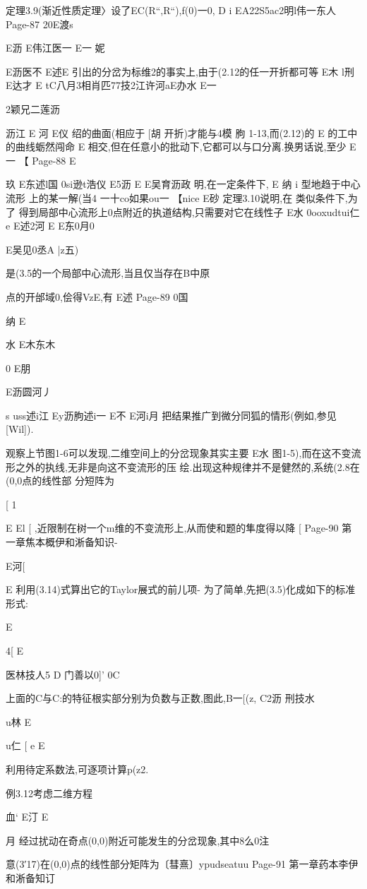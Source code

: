 {{{定理3.9(渐近性质定理〉设了EC(R“,R“),f(0)一0,
D
i
EA22S5ac2明l伟一东人
Page-87
20E渡s

E沥
E伟江医一
E一
妮

E沥医不
E述E
引出的分岔为标维2的事实上,由于(2.12的任一开折都可等
E木
l刑
E达才
E
tC八月3相肖匹77技2江许河aE办水
E一

2颖兄二莲沥

沥江
E
河
E仪
绍的曲面(相应于
[胡
开折)才能与4模
朐
1-13,而(2.12)的
E
的工中的曲线蛎然闯命
E
相交,但在任意小的批动下,它都可以与口分离.换男话说,至少
E一
【
Page-88
E

玖
E东述l国
0si逊t浩仪
E5沥
E
E吴育沥政
明,在一定条件下,
E
纳
i
型地趋于中心流形
上的某一解(当4
一十co如果ou一
【nice
E砂
定理3.10说明,在
类似条件下,为了
得到局部中心流形上0点附近的执道结构,只需要对它在线性子
E水
0ooxudtui仁e
E述2河
E
E东0月0

E吴见0丞A
|z五)}是(3.5的一个局部中心流形,当且仅当存在B中原

点的开邰域0,侩得VzE,有
E述
Page-89
0国

纳
E

水
E木东木

0
E朋

E沥圆河丿

s
uss述i江
Ey沥朐述i一
E不
E河i月
把结果推广到微分同狐的情形(例如,参见[Wil]).

观察上节图1-6可以发现,二维空间上的分岔现象其实主要
E水
图1-5),而在这不变流形之外的执线,无非是向这不变流形的压
绘.出现这种规律并不是健然的,系统(2.8在(0,0点的线性部
分短阵为

[
1

E
El
[
,近限制在树一个m维的不变流形上,从而使和题的隼度得以降
[
Page-90
第一章焦本概伊和淅备知识-

E河[

E
利用(3.14)式算出它的Taylor展式的前儿项-
为了简单,先把(3.5)化成如下的标准形式:

E

4[
E

医林技人5
D
门善以0]'
0C

上面的C与C:的特征根实部分别为负数与正数,图此,B一[(z,
C2沥
刑技水

u林
E

u仁
[
e
E

利用待定系数法,可逐项计算p(z2.

例3.12考虑二维方程

血`
E汀
E

月
经过扰动在奇点(0,0)附近可能发生的分岔现象,其中8么0注

意(3′17)在(0,0)点的线性部分矩阵为〔彗熹〕ypudseatuu
Page-91
第一章药本李伊和淅备知订

}}
